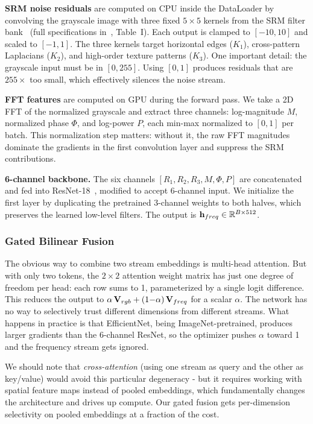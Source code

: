 \textbf{SRM noise residuals} are computed on CPU inside the DataLoader by convolving the grayscale image with three fixed $5\!\times\!5$ kernels from the SRM filter bank~\cite{fridrich2012srm} (full specifications in~\cite{fridrich2012srm}, Table~I). Each output is clamped to $[-10, 10]$ and scaled to $[-1, 1]$. The three kernels target horizontal edges ($K_1$), cross-pattern Laplacians ($K_2$), and high-order texture patterns ($K_3$). One important detail: the grayscale input must be in $[0, 255]$. Using $[0, 1]$ produces residuals that are $255\times$ too small, which effectively silences the noise stream.

\textbf{FFT features} are computed on GPU during the forward pass. We take a 2D FFT of the normalized grayscale and extract three channels: log-magnitude $M$, normalized phase $\Phi$, and log-power $P$, each min-max normalized to $[0, 1]$ per batch. This normalization step matters: without it, the raw FFT magnitudes dominate the gradients in the first convolution layer and suppress the SRM contributions.

\textbf{6-channel backbone.} The six channels $[R_1, R_2, R_3, M, \Phi, P]$ are concatenated and fed into ResNet-18~\cite{he2016resnet}, modified to accept 6-channel input. We initialize the first layer by duplicating the pretrained 3-channel weights to both halves, which preserves the learned low-level filters. The output is $\mathbf{h}_{freq} \in \mathbb{R}^{B \times 512}$.

\subsubsection{Gated Bilinear Fusion}
\label{sec:gated_fusion}

The obvious way to combine two stream embeddings is multi-head attention. But with only two tokens, the $2\!\times\!2$ attention weight matrix has just one degree of freedom per head: each row sums to 1, parameterized by a single logit difference. This reduces the output to $\alpha\,\mathbf{V}_{rgb} + (1{-}\alpha)\,\mathbf{V}_{freq}$ for a scalar $\alpha$. The network has no way to selectively trust different dimensions from different streams. What happens in practice is that EfficientNet, being ImageNet-pretrained, produces larger gradients than the 6-channel ResNet, so the optimizer pushes $\alpha$ toward 1 and the frequency stream gets ignored.

We should note that \textit{cross-attention} (using one stream as query and the other as key/value) would avoid this particular degeneracy - but it requires working with spatial feature maps instead of pooled embeddings, which fundamentally changes the architecture and drives up compute. Our gated fusion gets per-dimension selectivity on pooled embeddings at a fraction of the cost.

